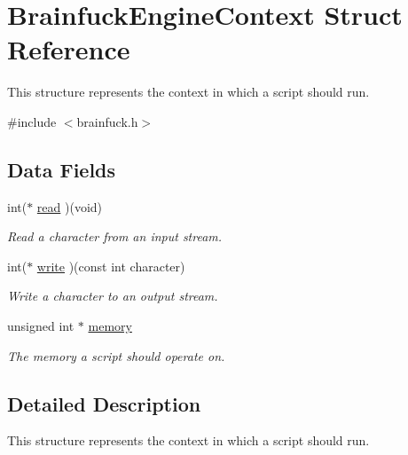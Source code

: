 \hypertarget{structBrainfuckEngineContext}{}\section{Brainfuck\+Engine\+Context Struct Reference}
\label{structBrainfuckEngineContext}


This structure represents the context in which a script should run.  




{\ttfamily \#include $<$brainfuck.\+h$>$}

\subsection*{Data Fields}
\begin{DoxyCompactItemize}
\item 
int($\ast$ \hyperlink{structBrainfuckEngineContext_a6b4909f710378c98e9b984afc78b9099}{read} )(void)
\begin{DoxyCompactList}\small\item\em Read a character from an input stream. \end{DoxyCompactList}\item 
int($\ast$ \hyperlink{structBrainfuckEngineContext_a8495230add7edb7d8f87bd1ef9771239}{write} )(const int character)
\begin{DoxyCompactList}\small\item\em Write a character to an output stream. \end{DoxyCompactList}\item 
\hypertarget{structBrainfuckEngineContext_a74ddd0ca5cb164878cfc152e88ad909c}{}unsigned int $\ast$ \hyperlink{structBrainfuckEngineContext_a74ddd0ca5cb164878cfc152e88ad909c}{memory}\label{structBrainfuckEngineContext_a74ddd0ca5cb164878cfc152e88ad909c}

\begin{DoxyCompactList}\small\item\em The memory a script should operate on. \end{DoxyCompactList}\end{DoxyCompactItemize}


\subsection{Detailed Description}
This structure represents the context in which a script should run. 

